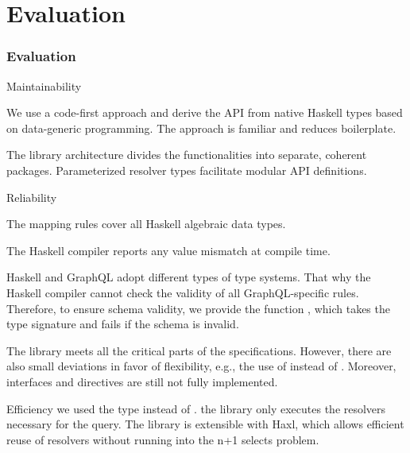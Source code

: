 \section{Evaluation}

\begin{frame}[allowframebreaks]\frametitle{Evaluation}

\begin{block}{Maintainability}

  \begin{itemize}
  
     We use a code-first approach and derive the API from native Haskell types based on data-generic programming. The approach is familiar and reduces boilerplate.

    The library architecture divides the functionalities into separate, coherent packages. Parameterized resolver types facilitate modular API definitions.

  \end{itemize}

\end{block}


\begin{block}{Reliability}

\begin{itemize}

    \begin{enumerate}

       The mapping rules cover all Haskell algebraic data types.

       The Haskell compiler reports any value mismatch at compile time.
      
       Haskell and GraphQL adopt different types of type systems. That why the Haskell compiler cannot check the validity of all GraphQL-specific rules. Therefore, to ensure schema validity, we provide the function , which takes the  type signature and fails if the schema is invalid.
    
    \end{enumerate}

   The library meets all the critical parts of the specifications. However, there are also small deviations in favor of flexibility, e.g., the use of  instead of . Moreover, interfaces and directives are still not fully implemented. 

\end{itemize}

\end{block}

\begin{block}{Efficiency} we used the type  instead of . the library only executes the resolvers necessary for the query. The library is extensible with Haxl, which allows efficient reuse of resolvers without running into the n+1 selects problem.

\end{block}

\end{frame}
